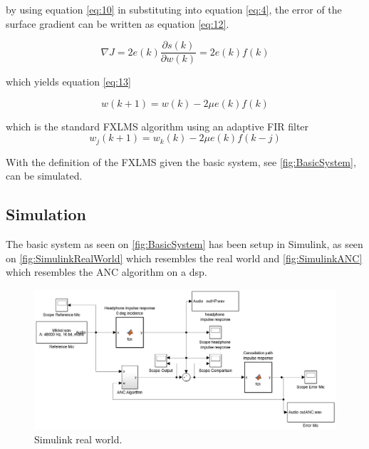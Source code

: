 by using equation \ref{eq:10} in substituting into equation \ref{eq:4}, the error of the surface gradient can be written as equation \ref{eq:12}.

\begin{equation}\label{eq:12}
\nabla J = 2e(k)\frac{\partial s(k)}{\partial w(k)} = 2e(k)f(k)
\end{equation}

which yields equation \ref{eq:13}

\begin{equation}\label{eq:13}
w(k+1) = w(k) - 2\mu e(k)f(k)
\end{equation}

which is the standard FXLMS algorithm using an adaptive FIR filter
\begin{equation}\label{eq:14}
w_j(k+1) = w_k(k) - 2\mu e(k)f(k-j)
\end{equation}

With the definition of the FXLMS given the basic system, see \autoref{fig:BasicSystem}, can be simulated.







\subsection*{Simulation} 
The basic system as seen on \autoref{fig:BasicSystem} has been setup in Simulink, as seen on \autoref{fig:SimulinkRealWorld} which resembles the real world and \autoref{fig:SimulinkANC} which resembles the ANC algorithm on a dsp. 

\begin{figure}[H]
	\centering
	\includegraphics[width=1\textwidth]{figures/BasicSystem/SimulinkRealWorld}
	\caption{Simulink real world.}
	\label{fig:SimulinkRealWorld}
\end{figure}    

